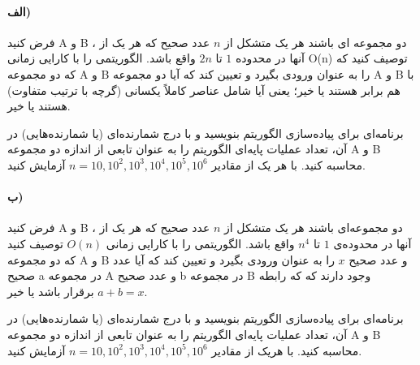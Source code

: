 \documentclass[]{article}
\begin{document}
\paragraph[3.1]{الف)}
فرض کنید A و B ، دو مجموعه ای باشند هر یک متشکل از $n$ عدد صحیح که هر یک از آنها در محدوده $1$ تا $2n$ واقع باشد.
الگوریتمی را با کارایی زمانی O(n) توصیف کنید که که دو مجموعه A و B را به عنوان ورودی بگیرد و تعیین کند که آیا دو مجموعه A و B با هم برابر هستند یا خیر؛
یعنی آیا شامل عناصر کاملاً یکسانی (گرچه با ترتیب متفاوت) هستند یا خیر.

برنامه‌ای برای پیاده‌سازی الگوریتم بنویسید و با درج شمارنده‌ای (یا شمارنده‌هایی) در آن، تعداد عملیات پایه‌ای الگوریتم را به عنوان تابعی از اندازه دو مجموعه A و B محاسبه کنید. با هر یک از مقادیر 
$n=10, 10^2, 10^3, 10^4, 10^5, 10^6$
آزمایش کنید. 
\paragraph[3.2]{ب)}
فرض کنید A و B ، دو مجموعه‌ای باشند هر یک متشکل از
$n$ عدد صحیح  که هر یک از آنها در محدوده‌ی
$1$ تا $n^4$ واقع باشد.
الگوریتمی را با کارایی زمانی $O(n)$ توصیف کنید 
که دو مجموعه A و B و عدد صحیح $x$ را به عنوان ورودی بگیرد و تعیین کند که آیا عدد صحیح a در مجموعه A و عدد صحیح b در مجموعه B وجود دارند که
که رابطه $a+b=x$ برقرار باشد یا خیر.

برنامه‌ای برای پیاده‌سازی الگوریتم بنویسید و با درج شمارنده‌ای (یا شمارنده‌هایی) در آن، تعداد عملیات پایه‌ای الگوریتم را به عنوان تابعی از اندازه دو مجموعه A و B محاسبه کنید.
با هریک از مقادیر $n=10, 10^2, 10^3, 10^4, 10^5, 10^6$ آزمایش کنید.
\end{document}
